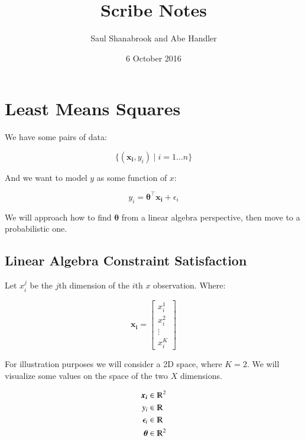 \documentclass{article}
\title{Scribe Notes}
\author{Saul Shanabrook and Abe Handler}
\date{6 October 2016}
\newcommand\given{\;\vert\;}
\begin{document}
\maketitle

\tableofcontents


\section{Least Means Squares}
We have some pairs of data:

$$
\{(\boldsymbol{x_i}, y_i) \given i=1\ldots n\}
$$

And we want to model $y$ as some function of $x$:

$$
y_i = \boldsymbol{\theta}^{\top} \boldsymbol{x_i} + \epsilon_i
$$

We will approach how to find $\boldsymbol{\theta}$ from a linear algebra perspective, then move to a probabilistic one. 


\subsection{Linear Algebra Constraint Satisfaction}
Let $x^j_i$ be the $j$th dimension of the $i$th $x$ observation. Where:

$$
\boldsymbol{x_i} = \begin{bmatrix}
x^1_i \\
x^2_i \\
\vdots \\
x^K_i
\end{bmatrix}
$$


For illustration purposes we will consider a 2D space, where $K=2$. We will visualize some values on the space of the two $X$ dimensions.

\begin{align*}
\boldsymbol{x_i} & \in \varmathbb{R}^2 \\
y_i & \in \varmathbb{R} \\
\epsilon_i & \in \varmathbb{R} \\
\boldsymbol{\theta} & \in \varmathbb{R}^2 \\
\end{align*}
\end{document}
